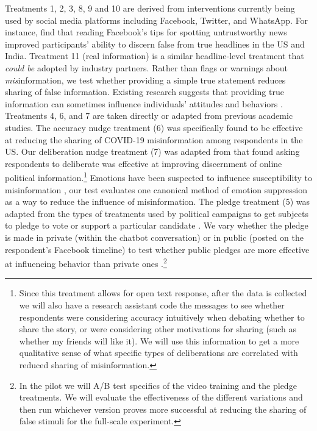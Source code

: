 \documentclass[letterpaper, 12pt, parskip=full,DIV=10]{scrartcl}
\begin{document}
Treatments 1, 2, 3, 8, 9 and 10 are derived from interventions currently being used by social media platforms including Facebook, Twitter, and WhatsApp. For instance, \citet{guessetal2020digital} find that reading Facebook's tips for spotting untrustworthy news improved participants' ability to discern false from true headlines in the US and India. Treatment 11 (real information) is a similar headline-level treatment that \textit{could be} adopted by industry partners. Rather than flags or warnings about \textit{mis}information, we test whether providing a simple true statement reduces sharing of false information. Existing research suggests that providing true information can sometimes influence individuals' attitudes and behaviors \citep{gilens2001political}. %
Treatments 4, 6, and 7 are taken directly or adapted from previous academic studies. The accuracy nudge treatment (6) was specifically found to be effective at reducing the sharing of COVID-19 misinformation among respondents in the US. Our deliberation nudge treatment (7) was adapted from \citet{bago2020fake} that found asking respondents to deliberate was effective at improving discernment of online political information.\footnote{{Since this treatment allows for open text response, after the data is collected we will also have a research assistant code the messages to see whether respondents were considering accuracy intuitively when debating whether to share the story, or were considering other motivations for sharing (such as whether my friends will like it). We will use this information to get a more qualitative sense of what specific types of deliberations are correlated with reduced sharing of misinformation.}} Emotions have been suspected to influence susceptibility to misinformation \citep{martel2019reliance}, our test evaluates one canonical method of emotion suppression as a way to reduce the influence of misinformation. The pledge treatment (5) was adapted from the types of treatments used by political campaigns to get subjects to pledge to vote or support a particular candidate \citep{costa2018walking}. %
We vary whether the pledge is made in private (within the chatbot conversation) or in public (posted on the respondent's Facebook timeline) to test whether public pledges are more effective at influencing behavior than private ones \citep{cotterill2013impact}.\footnote{In the pilot we will A/B test specifics of the video training and the pledge treatments. We will evaluate the effectiveness of the different variations and then run whichever version proves more successful at reducing the sharing of false stimuli for the full-scale experiment.}
\end{document}
